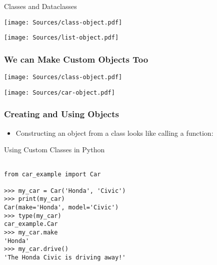 \documentclass[handout, 11pt]{beamer}
\begin{document}
\begin{section}[Classes]{Classes and Dataclasses}
\begin{frame}
\begin{adjustbox}{width=0.425\textwidth, height=0.8\textheight, keepaspectratio}
\texttt{[image: Sources/class-object.pdf]}
\end{adjustbox}
\hfill
\begin{adjustbox}{width=0.425\textwidth, height=0.8\textheight, keepaspectratio}
\texttt{[image: Sources/list-object.pdf]}
\end{adjustbox}
\end{frame}
\begin{frame}
\frametitle{We can Make Custom Objects Too}
\begin{adjustbox}{width=0.425\textwidth, height=0.8\textheight, keepaspectratio}
\texttt{[image: Sources/class-object.pdf]}
\end{adjustbox}
\hfill
\begin{adjustbox}{width=0.425\textwidth, height=0.8\textheight, keepaspectratio}
\texttt{[image: Sources/car-object.pdf]}
\end{adjustbox}
\end{frame}
\begin{frame}[fragile]
\frametitle{Creating and Using Objects}
\begin{itemize}
\item Constructing an object from a class looks like calling a function:
\end{itemize}
\begin{block}{Using Custom Classes in Python}
\small
\begin{verbatim}

from car_example import Car

>>> my_car = Car('Honda', 'Civic')
>>> print(my_car)
Car(make='Honda', model='Civic')
>>> type(my_car)
car_example.Car
>>> my_car.make
'Honda'
>>> my_car.drive()
'The Honda Civic is driving away!'


\end{verbatim}
\end{block}
\end{frame}
\end{section}
\end{document}
